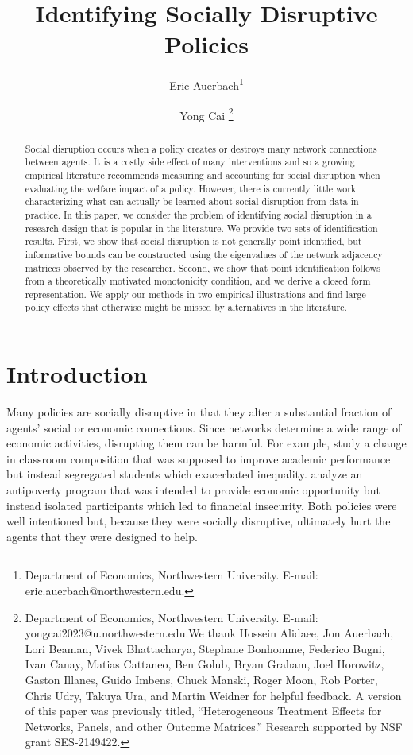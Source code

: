 \documentclass[12pt]{article}
\title{Identifying Socially Disruptive Policies}
\author{Eric Auerbach\footnote{Department of Economics, Northwestern University. E-mail: eric.auerbach@northwestern.edu.} \and Yong Cai \footnote{Department of Economics, Northwestern University. E-mail: yongcai2023@u.northwestern.edu.\newline We thank Hossein Alidaee, Jon Auerbach, Lori Beaman, Vivek Bhattacharya, Stephane Bonhomme, Federico Bugni, Ivan Canay, Matias Cattaneo, Ben Golub, Bryan Graham, Joel Horowitz, Gaston Illanes, Guido Imbens, Chuck Manski, Roger Moon, Rob Porter, Chris Udry, Takuya Ura, and Martin Weidner  for helpful feedback. A version of this paper was previously titled, ``Heterogeneous Treatment Effects for Networks, Panels, and other Outcome Matrices.'' Research supported by NSF grant SES-2149422.}}
\date{\parbox{\linewidth}{\centering%
  \today\endgraf}}
\theoremstyle{definition}
\begin{document}
\maketitle

\begin{abstract} \noindent
Social disruption occurs when a policy creates or destroys many network connections between agents. It is a costly side effect of many interventions and so a growing empirical literature recommends measuring and accounting for social disruption when evaluating the welfare impact of a policy. However, there is currently little work characterizing what can actually be learned about social disruption from data in practice. In this paper, we consider the problem of identifying social disruption in a research design that is popular in the literature. We provide two sets of identification results. First, we show that social disruption is not generally point identified, but informative bounds can be constructed using the eigenvalues of the network adjacency matrices observed by the researcher. Second, we show that point identification follows from a theoretically motivated monotonicity condition, and we derive a closed form representation. We apply our methods in two empirical illustrations and find large policy effects that otherwise might be missed by alternatives in the literature.    
\end{abstract}


\section{Introduction}

Many policies are socially disruptive in that they alter a substantial fraction of agents' social or economic connections. Since networks determine a wide range of economic activities, disrupting them can be harmful. For example, \cite{carrell2013natural} study a change in classroom composition that was supposed to improve academic performance but instead segregated students which exacerbated inequality. \cite{barnhardt2017moving} analyze an antipoverty program that was intended to provide economic opportunity but instead isolated participants which led to financial insecurity. Both policies were well intentioned but, because they were socially disruptive, ultimately hurt the agents that they were designed to help. 
\end{document}
